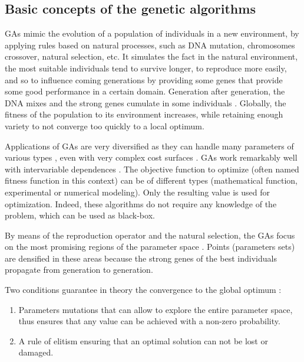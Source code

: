 \documentclass{ametsoc}
\begin{document}
\subsection{Basic concepts of the genetic algorithms}

GAs mimic the evolution of a population of individuals in a new environment, by applying rules based on natural processes, such as DNA mutation, chromosomes crossover, natural selection, etc. It simulates the fact in the natural environment, the most suitable individuals tend to survive longer, to reproduce more easily, and so to influence coming generations by providing some genes that provide some good performance in a certain domain. Generation after generation, the DNA mixes and the strong genes cumulate in some individuals \citep{Beasley1996a}. Globally, the fitness of the population to its environment increases, while retaining enough variety to not converge too quickly to a local optimum.

Applications of GAs are very diversified as they can handle many parameters of various types \citep{Joines1996a}, even with very complex cost surfaces \citep{Haupt2004}. GAs work remarkably well with intervariable dependences \citep{Haupt2004}. The objective function to optimize (often named fitness function in this context) can be of different types (mathematical function, experimental or numerical modeling). Only the resulting value is used for optimization. Indeed, these algorithms do not require any knowledge of the problem, which can be used as black-box.

By means of the reproduction operator and the natural selection, the GAs focus on the most promising regions of the parameter space \citep{Holland1992b}. Points (parameters sets) are densified in these areas because the strong genes of the best individuals propagate from generation to generation.

Two conditions guarantee in theory the convergence to the global optimum \citep{Zitzler2004a}:

\begin{enumerate}
	\item Parameters mutations that can allow to explore the entire parameter space, thus ensures that any value can be achieved with a non-zero probability.
	\item A rule of elitism ensuring that an optimal solution can not be lost or damaged.
\end{enumerate}
\end{document}
